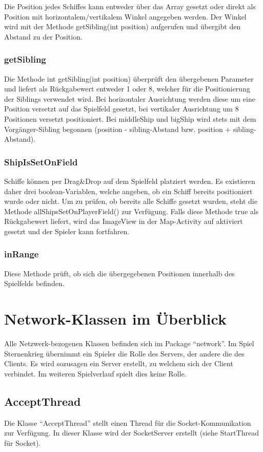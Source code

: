\documentclass[11pt]{article} %
\begin{document}
Die Position jedes Schiffes kann entweder über das Array gesetzt oder direkt als Position mit horizontalem/vertikalem Winkel angegeben werden. Der Winkel wird mit der Methode getSibling(int position) aufgerufen und übergibt den Abstand zu der Position.

\subsubsection{getSibling}
Die Methode int getSibling(int position) überprüft den übergebenen Parameter und liefert als Rückgabewert entweder 1 oder 8, welcher für die Positionierung der Siblings verwendet wird. Bei horizontaler Ausrichtung werden diese um eine Position versetzt auf das Spielfeld gesetzt, bei vertikaler Ausrichtung um 8 Positionen versetzt positioniert. Bei middleShip und bigShip wird stets mit dem Vorgänger-Sibling begonnen (position - sibling-Abstand bzw. position + sibling-Abstand).

\subsubsection{ShipIsSetOnField}
Schiffe können per Drag\&Drop auf dem Spielfeld platziert werden. Es existieren daher drei boolean-Variablen, welche angeben, ob ein Schiff bereits positioniert wurde oder nicht. Um zu prüfen, ob bereits alle Schiffe gesetzt wurden, steht die Methode allShipsSetOnPlayerField() zur Verfügung. Falls diese Methode true als Rückgabewert liefert, wird das ImageView in der Map-Activity auf aktiviert gesetzt und der Spieler kann fortfahren.

\subsubsection{inRange}
Diese Methode prüft, ob sich die übergegebenen Positionen innerhalb des Spielfelds befinden.

\section{Network-Klassen im Überblick}
Alle Netzwerk-bezogenen Klassen befinden sich im Package \enquote{network}. Im Spiel Sternenkrieg übernimmt ein Spieler die Rolle des Servers, der andere die des Clients. Es wird sozusagen ein Server erstellt, zu welchem sich der Client verbindet. Im weiteren Spielverlauf spielt dies keine Rolle.

\subsection{AcceptThread}
Die Klasse \enquote{AcceptThread} stellt einen Thread für die Socket-Kommunikation zur Verfügung. In dieser Klasse wird der SocketServer erstellt (siehe StartThread für Socket).
\end{document}

